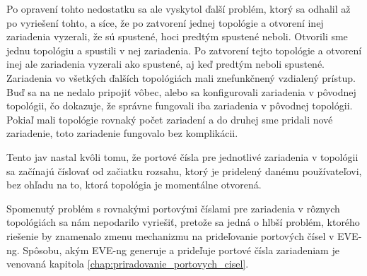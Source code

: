 Po opravení tohto nedostatku sa ale vyskytol ďalší problém, ktorý sa odhalil až po vyriešení tohto, a síce, že po zatvorení jednej topológie 
a otvorení inej 
zariadenia vyzerali, že sú spustené, hoci predtým spustené neboli.
Otvorili sme jednu topológiu a spustili v nej zariadenia. Po zatvorení tejto topológie a otvorení inej ale zariadenia vyzerali ako spustené, aj keď predtým neboli spustené.
Zariadenia vo všetkých ďalších topológiách mali znefunkčnený vzdialený prístup. Buď sa na ne nedalo pripojiť vôbec, alebo sa konfigurovali zariadenia v pôvodnej topológii, čo dokazuje, že správne fungovali iba zariadenia v pôvodnej topológii. Pokiaľ mali topológie rovnaký počet zariadení a do druhej sme pridali nové zariadenie, toto zariadenie fungovalo bez komplikácii.

Tento jav nastal kvôli tomu, že portové čísla pre jednotlivé zariadenia v topológii sa začínajú číslovať od začiatku rozsahu, ktorý je pridelený danému používateľovi, bez ohľadu na to, ktorá topológia je momentálne otvorená.

Spomenutý problém s rovnakými portovými číslami pre zariadenia v rôznych topológiách sa nám nepodarilo vyriešiť, pretože sa jedná o hlbší problém, ktorého riešenie by znamenalo zmenu mechanizmu na prideľovanie portových čísel v EVE-ng. Spôsobu, akým EVE-ng generuje a prideľuje portové čísla zariadeniam je venovaná kapitola \ref{chap:priradovanie_portovych_cisel}.

\begin{comment}
\begin{figure}
    \centering
    \texttt{[image: eve\_ng\_zle\_portove\_cisla\_1]}
    \caption{Prvá topológia a celkový počet spustených zariadení}
    \label{obr:eve_ng_zle_portove_cisla_1}
\end{figure}

\begin{figure}
    \centering
    \texttt{[image: eve\_ng\_zle\_portove\_cisla\_2]}
    \caption{Druhá topológia a celkový počet spustených zariadení}
    \label{obr:eve_ng_zle_portove_cisla_2}
\end{figure}
\end{comment}

